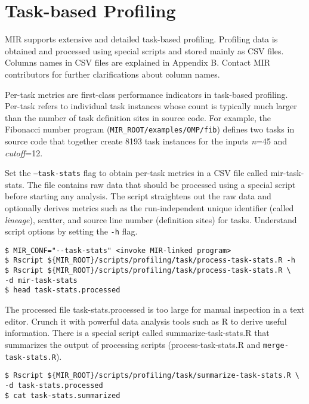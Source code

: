 \documentclass[11pt,a4paper]{article}
\begin{document}
\section{Task-based Profiling}\label{sec:task-based-profiling}

MIR supports extensive and detailed task-based profiling. Profiling data is obtained and processed using special scripts and stored mainly as CSV files.
Columns names in CSV files are explained in Appendix B. Contact MIR contributors for further clarifications about column names.

Per-task metrics are first-class performance indicators in task-based profiling.
Per-task refers to individual task instances whose count is typically much larger than the number of task definition sites in source code. For example, the Fibonacci number program (\texttt{MIR\_ROOT/examples/OMP/fib}) defines two tasks in source code that together create 8193 task instances for the inputs \textit{n}=45 and \textit{cutoff}=12.

Set the \texttt{--task-stats} flag to obtain per-task metrics in a CSV file called \textsf{mir-task-stats}. The file contains raw data that should be processed using a special script before starting any analysis. The script straightens out the raw data and optionally derives metrics such as the run-independent unique identifier (called \textit{lineage}), scatter, and source line number (definition sites) for tasks. Understand script options by setting the \texttt{-h} flag.

\begin{lstlisting}[style=MyInputStyle]
$ MIR_CONF="--task-stats" <invoke MIR-linked program>
$ Rscript ${MIR_ROOT}/scripts/profiling/task/process-task-stats.R -h
$ Rscript ${MIR_ROOT}/scripts/profiling/task/process-task-stats.R \
-d mir-task-stats
$ head task-stats.processed
\end{lstlisting}

The processed file \textsf{task-stats.processed} is too large for manual inspection in a text editor. Crunch it with powerful data analysis tools such as R to derive useful information. There is a special script called \textsf{summarize-task-stats.R} that summarizes the output of processing scripts (\textsf{process-task-stats.R} and \texttt{merge-task-stats.R}).
\begin{lstlisting}[style=MyInputStyle]
$ Rscript ${MIR_ROOT}/scripts/profiling/task/summarize-task-stats.R \
-d task-stats.processed
$ cat task-stats.summarized
\end{lstlisting}
\end{document}
